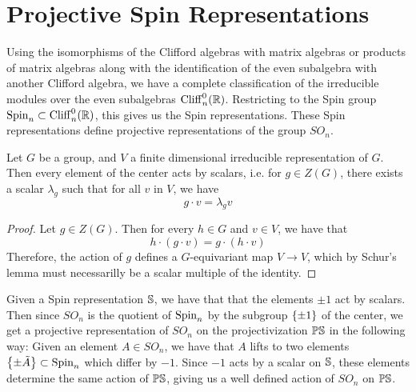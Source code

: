 %
\section{Projective Spin Representations}
%
Using the isomorphisms of the Clifford algebras with matrix algebras
or products of matrix algebras along with the identification of the
even subalgebra with another Clifford algebra, we have a complete classification
of the irreducible modules over the even subalgebras $\Cliff^0_{n}(\R)$.
Restricting to the Spin group $\Spin_n \subset \Cliff^0_n(\R)$, this gives us
the Spin representations. These Spin representations define projective
representations of the group $SO_n$.
%
\begin{prop}
Let $G$ be a group, and $V$ a finite dimensional irreducible representation of $G$.
Then every element of the center acts by scalars, i.e. for $g \in Z(G)$, there
exists a scalar $\lambda_g$ such that for all $v$ in $V$, we have
\[
g \cdot v = \lambda_g v
\]
\end{prop}
%
\begin{proof}
Let $g \in Z(G)$. Then for every $h \in G$ and $v \in V$, we have that
\[
h \cdot (g\cdot v) = g \cdot (h\cdot v)
\]
Therefore, the action of $g$ defines a $G$-equivariant map $V \to V$, which
by Schur's lemma must necessarilly be a scalar multiple of the identity.
\end{proof}
%
Given a Spin representation $\S$, we have that that the elements
$\pm 1$ act by scalars. Then since $SO_n$ is the quotient of $\Spin_n$ by the
subgroup $\set{\pm 1}$ of the center, we get a projective representation of
$SO_n$ on the projectivization $\P\S$ in the following way:
Given an element $A \in SO_n$, we have that $A$ lifts to two elements
$\set{\pm \tilde{A}} \subset \Spin_n$ which differ by $-1$. Since $-1$
acts by a scalar on $\S$, these elements determine the same action of
$\P\S$, giving us a well defined action of $SO_n$ on $\P\S$.

